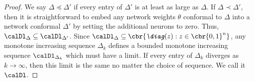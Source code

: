 
\limitingActivationSet*
\begin{proof}
    We say \( \Delta \preceq \Delta' \) if every entry of
    \( \Delta' \) is at least as large as \( \Delta \).
    If \( \Delta \prec \Delta' \), then it is straightforward to embed
    any network weights \( \theta \) conformal to \( \Delta \) into a network
    conformal \( \Delta' \) by setting the additional neurons to zero.
    Thus, \( \calDl_{\Delta} \subseteq \calDl_{\Delta'} \).
    Since
    \( \calDl_{\Delta} \subseteq \cbr{ \emph{\diag}(z) : z \in \cbr{0, 1}^n} \),
    any monotone increasing sequence \( \Delta_{k} \) defines a bounded
    monotone increasing sequence \( \calDl_{\Delta_k} \) which must have
    a limit.
    If every entry of \( \Delta_k \) diverges as \( k \rightarrow \infty \),
    then this limit is the same no matter the choice of sequence.
    We call it \( \calDl \).
\end{proof}

